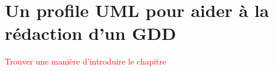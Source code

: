 \chapter{Un profile UML pour aider à la rédaction d'un GDD}

\label{game-genesis.sect}

\textcolor{red}{Trouver une manière d'introduire le chapitre}
\begin{comment}
\chapter{Un langage de modélisation pour l'établissement d'un Game Design Document}

\section{Le concept}
\subsection{Définition}
\subsubsection{Quoi ?}
Un langage permettant de modéliser et stocker des idées lors des phases de Breakthrough et de Conception d'un projet de jeu vidéo. La modélisation peut être graphique et/ou textuelle avec application des modifications en parallèle. \\
Les informations peuvent contenir tout le nécessaire pour exprimer les idées (textes, informations numériques, chemins de fichiers...). Les champs peuvent être personalisables pour permettre de la souplesse aux utilisateurs.

\subsubsection{Pour quoi faire ?}
\paragraph{Des outils de modélisation existent pour tous les domaines reliés au développement de logiciels. Ils sont souvent spécifiques à un corps de métier afin de pouvoir proposer un maximum de fonctionnalités spécifiques sans devenir trop compliqué et en utilisant un vocabulaire précis qui correspond au corps de métier concerné.}


\end{comment}
